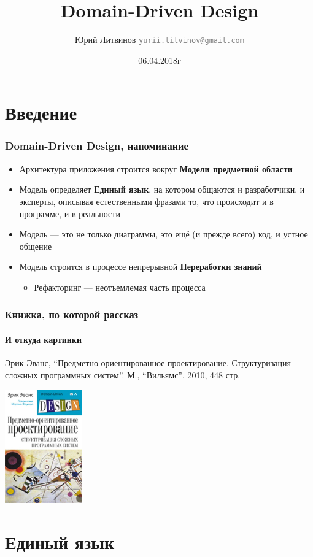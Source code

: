 \documentclass[xetex,mathserif,serif]{beamer}
\title{Domain-Driven Design}
\author[Юрий Литвинов]{Юрий Литвинов \newline \textcolor{gray}{\small\texttt{yurii.litvinov@gmail.com}}}
\date{06.04.2018г}
\begin{document}
	
	\frame{\titlepage}

	\section{Введение}

	\begin{frame}
		\frametitle{Domain-Driven Design, напоминание}
		\begin{itemize}
			\item Архитектура приложения строится вокруг \textbf{Модели предметной области}
			\item Модель определяет \textbf{Единый язык}, на котором общаются и разработчики, и эксперты, описывая естественными фразами то, что происходит и в программе, и в реальности
			\item Модель --- это не только диаграммы, это ещё (и прежде всего) код, и устное общение
			\item Модель строится в процессе непрерывной \textbf{Переработки знаний}
			\begin{itemize}
				\item Рефакторинг --- неотъемлемая часть процесса
			\end{itemize}
		\end{itemize}
	\end{frame}

	\begin{frame}
		\frametitle{Книжка, по которой рассказ}
		\framesubtitle{И откуда картинки}
		Эрик Эванс, ``Предметно-ориентированное проектирование. Структуризация сложных программных систем''. М., ``Вильямс'', 2010, 448 стр.
		\begin{center}
			\includegraphics[width=0.25\textwidth]{dddCover.jpg}
		\end{center}
	\end{frame}

	\section{Единый язык}
\end{document}

